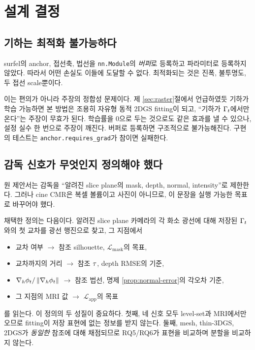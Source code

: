 \section{설계 결정}
\label{sec:impl-decisions}

\subsection{기하는 최적화 불가능하다}

surfel의 anchor, 접선축, 법선을 \texttt{nn.Module}의 \emph{버퍼}로 등록하고 파라미터로
등록하지 않았다. 따라서 어떤 손실도 이들에 도달할 수 없다. 최적화되는 것은 진폭,
불투명도, 두 접선 scale뿐이다.

이는 편의가 아니라 주장의 정합성 문제이다. 제 \ref{sec:raster}절에서 언급하였듯
기하가 학습 가능하면 본 방법은 조용히 자유형 동적 2DGS fitting이 되고, ``기하가
$\Gamma_t$에서만 온다''는 주장이 무효가 된다. 학습률을 0으로 두는 것으로도 같은 효과를
낼 수 있으나, 설정 실수 한 번으로 주장이 깨진다. 버퍼로 등록하면 구조적으로 불가능해진다.
구현의 테스트는 \texttt{anchor.requires\_grad}가 참이면 실패한다.

\subsection{감독 신호가 무엇인지 정의해야 했다}

원 제안서는 감독을 ``알려진 slice plane의 mask, depth, normal, intensity''로 제한한다.
그러나 cine CMR은 복셀 볼륨이고 사진이 아니므로, 이 문장을 실행 가능한 목표로
바꾸어야 했다.

채택한 정의는 다음이다. 알려진 slice plane 카메라의 각 화소 광선에 대해 저장된
$\Gamma_t$와의 첫 교차를 광선 행진으로 찾고, 그 지점에서
\begin{itemize}[leftmargin=2em]
  \item 교차 여부 $\to$ 참조 silhouette, $\mathcal{L}_{\mathrm{mask}}$의 목표,
  \item 교차까지의 거리 $\to$ 참조 $\tau$, depth RMSE의 기준,
  \item $\nabla_h\phi_t/\left\lVert \nabla_h\phi_t \right\rVert$ $\to$ 참조 법선, 명제
  \ref{prop:normal-error}의 각오차 기준,
  \item 그 지점의 MRI 값 $\to$ $\mathcal{L}_{\mathrm{app}}$의 목표
\end{itemize}
를 읽는다. 이 정의의 두 성질이 중요하다. 첫째, 네 신호 모두 level-set과 MRI에서만
오므로 fitting이 저장 표현에 없는 정보를 받지 않는다. 둘째, mesh, thin-3DGS, 2DGS가
\emph{동일한} 참조에 대해 채점되므로 RQ5/RQ6가 표현을 비교하며 분할을 비교하지 않는다.

